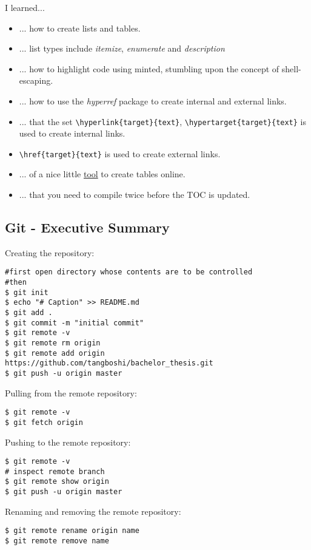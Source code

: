 \documentclass{article}
\begin{document}
I learned...
\begin{itemize} 
	\item ... how to create lists and tables.
	\item ... list types include \emph{itemize}, \emph{enumerate} and \emph{description}
	\item ... how to highlight code using minted, stumbling upon the concept of shell-escaping.
	\item ... how to use the \emph{hyperref} package to create internal and external links.
	\item ... that the set \verb|\hyperlink{target}{text}|, \verb|\hypertarget{target}{text}| is used to create internal links.
	\item \verb|\href{target}{text}| is used to create external links.
	\item ... of a nice little \href{http://www.tablesgenerator.com/}{tool} to create tables online.
	\item  ... that you need to compile twice before the TOC is updated.
\end{itemize}

\subsection{Git - Executive Summary}

Creating the repository:

\begin{verbatim}
#first open directory whose contents are to be controlled
#then
$ git init
$ echo "# Caption" >> README.md
$ git add .
$ git commit -m "initial commit"
$ git remote -v
$ git remote rm origin
$ git remote add origin https://github.com/tangboshi/bachelor_thesis.git
$ git push -u origin master
\end{verbatim}

Pulling from the remote repository:

\begin{verbatim}
$ git remote -v
$ git fetch origin
\end{verbatim}

Pushing to the remote repository:

\begin{verbatim}
$ git remote -v
# inspect remote branch
$ git remote show origin
$ git push -u origin master
\end{verbatim}

Renaming and removing the remote repository:

\begin{verbatim}
$ git remote rename origin name
$ git remote remove name 
\end{verbatim}
\end{document}
